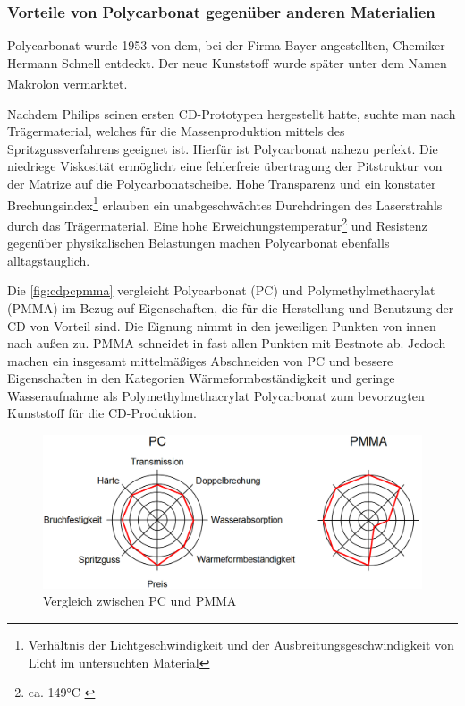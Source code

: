 \subsubsection{Vorteile von Polycarbonat gegenüber anderen Materialien}

Polycarbonat wurde 1953 von dem, bei der Firma Bayer angestellten, Chemiker
Hermann Schnell entdeckt. Der neue Kunststoff wurde später unter dem Namen
Makrolon\textsuperscript{\textregistered} vermarktet. \cite{cuzpc}

Nachdem Philips seinen ersten CD-Prototypen hergestellt hatte, suchte man nach
Trägermaterial, welches für die Massenproduktion mittels des
Spritzgussverfahrens geeignet ist. Hierfür ist Polycarbonat nahezu perfekt. Die
niedriege Viskosität ermöglicht eine fehlerfreie übertragung der Pitstruktur von
der Matrize auf die Polycarbonatscheibe. Hohe Transparenz und ein konstater
Brechungsindex\footnote{Verhältnis der Lichtgeschwindigkeit und der
Ausbreitungsgeschwindigkeit von Licht im untersuchten Material} erlauben ein
unabgeschwächtes Durchdringen des Laserstrahls durch das Trägermaterial. Eine
hohe Erweichungstemperatur\footnote{ca. 149°C \cite{cuzpc2}} und Resistenz
gegenüber physikalischen Belastungen machen Polycarbonat ebenfalls
alltagstauglich. \cite{cfcd}

Die \autoref{fig:cdpcpmma} vergleicht Polycarbonat (PC) und
Polymethylmethacrylat (PMMA) im Bezug auf Eigenschaften, die für die
Herstellung und Benutzung der CD von Vorteil sind. Die Eignung nimmt in den jeweiligen
Punkten von innen nach außen zu. PMMA schneidet in fast allen Punkten mit
Bestnote ab. Jedoch machen ein insgesamt mittelmäßiges Abschneiden von PC und
bessere Eigenschaften in den Kategorien Wärmeformbeständigkeit und geringe
Wasseraufnahme als Polymethylmethacrylat Polycarbonat zum bevorzugten Kunststoff
für die CD-Produktion.

\begin{figure}[h]
    \begin{center}
        \begin{minipage}[t]{\textwidth}
            \begin{center}
                \includegraphics[height=0.1\textheight]{Bilder/Optische_Datentraeger_Die_Compact_Disc/Material_Polycarbonat/cdpcpmma.png}
                \caption[Vergleich zwischen PC und PMMA \newline Roth, Klaus: CD, DVD \& Co.: Die Chemie der schillernden Scheiben, in: Chemie in unserer Zeit (41/2007), S. 337]{Vergleich zwischen PC und PMMA}
                \label{fig:cdpcpmma}
            \end{center}
        \end{minipage}
    \end{center}
\end{figure}
